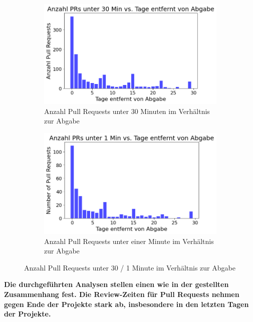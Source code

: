 \begin{figure}[htbp]
    \centering
    \begin{subfigure}[b]{0.48\textwidth}
        \centering
        \includegraphics[width=\textwidth]{Figures/anz-prs-under-30-min.png}
    \caption{Anzahl Pull Requests unter 30 Minuten im Verhältnis zur Abgabe}
    \label{fig:anz-prs-under-30-min}
    \end{subfigure}
    \hfill
    \begin{subfigure}[b]{0.48\textwidth}
        \centering
        \includegraphics[width=\textwidth]{Figures/anz-prs-under-1-min.png}
    \caption{Anzahl Pull Requests unter einer Minute im Verhältnis zur Abgabe}
    \label{fig:anz-prs-under-1-min}
    \end{subfigure}
    \caption{Anzahl Pull Requests unter 30 / 1 Minute im Verhältnis zur Abgabe}
    \label{fig:anz-prs-under-x-mins}
\end{figure}

\textbf{Die durchgeführten Analysen stellen einen wie in der  gestellten Zusammenhang fest. Die Review-Zeiten für Pull Requests nehmen gegen Ende der Projekte stark ab, insbesondere in den letzten Tagen der Projekte.}

